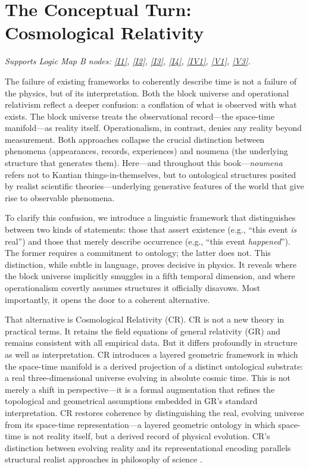 \documentclass[12pt]{book}
\begin{document}
\section{The Conceptual Turn: Cosmological Relativity}\label{sec:1.3}
\noindent\textit{Supports Logic Map B nodes: \hyperref[appendix:I1]{[I1]}, \hyperref[appendix:I2]{[I2]}, \hyperref[appendix:I3]{[I3]}, \hyperref[appendix:I4]{[I4]}, \hyperref[appendix:IV1]{[IV1]}, \hyperref[appendix:V1]{[V1]}, \hyperref[appendix:V3]{[V3]}.}

\vspace{4pt}

The failure of existing frameworks to coherently describe time is not a failure of the physics, but of its interpretation. Both the block universe and operational relativism reflect a deeper confusion: a conflation of what is observed with what exists. The block universe treats the observational record---the space-time manifold---as reality itself. Operationalism, in contrast, denies any reality beyond measurement. Both approaches collapse the crucial distinction between phenomena (appearances, records, experiences) and noumena (the underlying structure that generates them). Here---and throughout this book---\textit{noumena} refers not to Kantian things-in-themselves, but to ontological structures posited by realist scientific theories---underlying generative features of the world that give rise to observable phenomena.

To clarify this confusion, we introduce a linguistic framework that distinguishes between two kinds of statements: those that assert existence (e.g., ``this event \textit{is} real'') and those that merely describe occurrence (e.g., ``this event \textit{happened}''). The former requires a commitment to ontology; the latter does not. This distinction, while subtle in language, proves decisive in physics. It reveals where the block universe implicitly smuggles in a fifth temporal dimension, and where operationalism covertly assumes structures it officially disavows. Most importantly, it opens the door to a coherent alternative.

That alternative is Cosmological Relativity (CR). CR is not a new theory in practical terms. It retains the field equations of general relativity (GR) and remains consistent with all empirical data. But it differs profoundly in structure as well as interpretation. CR introduces a layered geometric framework in which the space-time manifold is a derived projection of a distinct ontological substrate: a real three-dimensional universe evolving in absolute cosmic time. This is not merely a shift in perspective---it is a formal augmentation that refines the topological and geometrical assumptions embedded in GR's standard interpretation. CR restores coherence by distinguishing the real, evolving universe from its space-time representation---a layered geometric ontology in which space-time is not reality itself, but a derived record of physical evolution. CR's distinction between evolving reality and its representational encoding parallels structural realist approaches in philosophy of science \citep{Worrall1989, Ladyman2007}.
\end{document}
